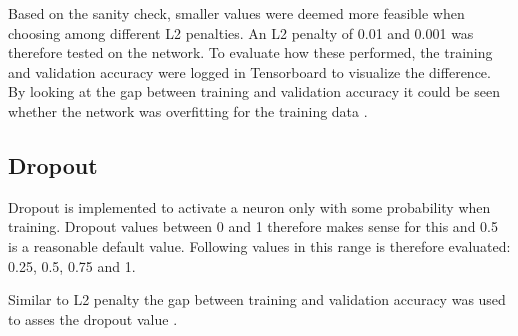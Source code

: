 Based on the sanity check, smaller values were deemed more feasible when choosing among different L2 penalties. An L2 penalty of 0.01 and 0.001 was therefore tested on the network. To evaluate how these performed, the training and validation accuracy were logged in Tensorboard to visualize the difference. By looking at the gap between training and validation accuracy it could be seen whether the network was overfitting for the training data \citep{NN3}.

\subsection{Dropout}
Dropout is implemented to activate a neuron only with some probability when training. Dropout values between 0 and 1 therefore makes sense for this and 0.5 is a reasonable default value\citep{NN3}. Following values in this range is therefore evaluated: 0.25, 0.5, 0.75 and 1.

Similar to L2 penalty the gap between training and validation accuracy was used to asses the dropout value \citep{NN3}. 





